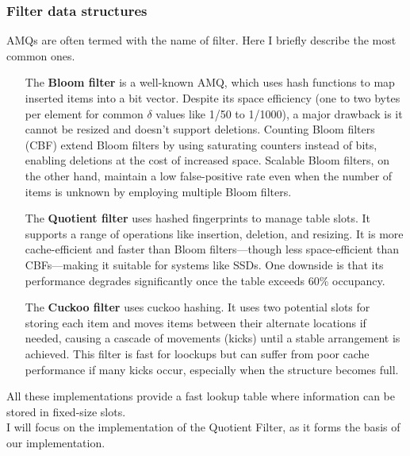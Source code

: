 \subsubsection{Filter data structures}
AMQs are often termed with the name of filter. Here I briefly describe the most common ones.
\begin{itemize}
	\item[The \textbf{Bloom filter}] is a well-known AMQ, which uses hash functions to map inserted items into a bit vector. Despite its space efficiency (one to two bytes per element for common $\delta$ values like 1/50 to 1/1000), a major drawback is it cannot be resized and doesn't support deletions. Counting Bloom filters (CBF) extend Bloom filters by using saturating counters instead of bits, enabling deletions at the cost of increased space. Scalable Bloom filters, on the other hand, maintain a low false-positive rate even when the number of items is unknown by employing multiple Bloom filters.
	\item[The \textbf{Quotient filter}] uses hashed fingerprints to manage table slots. It supports a range of operations like insertion, deletion, and resizing. It is more cache-efficient and faster than Bloom filters—though less space-efficient than CBFs—making it suitable for systems like SSDs. One downside is that its performance degrades significantly once the table exceeds 60\% occupancy.
	\item[The \textbf{Cuckoo filter}] uses cuckoo hashing. It uses two potential slots for storing each item and moves items between their alternate locations if needed, causing a cascade of movements (kicks) until a stable arrangement is achieved. This filter is fast for loockups but can suffer from poor cache performance if many kicks occur, especially when the structure becomes full.
\end{itemize}
All these implementations provide a fast lookup table where information can be stored in fixed-size slots.\\
I will focus on the implementation of the Quotient Filter, as it forms the basis of our implementation.

